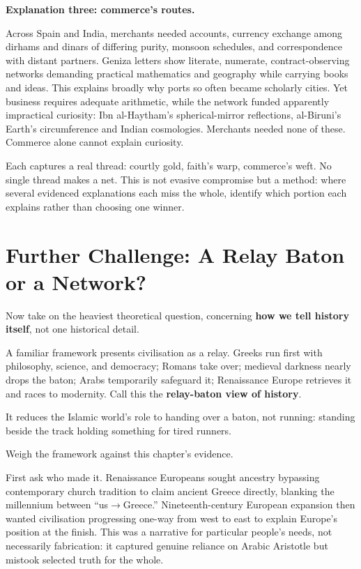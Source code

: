 \textbf{Explanation three: commerce's routes.}

Across Spain and India, merchants needed accounts, currency exchange among dirhams and dinars of differing purity, monsoon schedules, and correspondence with distant partners. Geniza letters show literate, numerate, contract-observing networks demanding practical mathematics and geography while carrying books and ideas. This explains broadly why ports so often became scholarly cities. Yet business requires adequate arithmetic, while the network funded apparently impractical curiosity: Ibn al-Haytham's spherical-mirror reflections, al-Biruni's Earth's circumference and Indian cosmologies. Merchants needed none of these. Commerce alone cannot explain curiosity.

Each captures a real thread: courtly gold, faith's warp, commerce's weft. No single thread makes a net. This is not evasive compromise but a method: where several evidenced explanations each miss the whole, identify which portion each explains rather than choosing one winner.

\section[Further Challenge: Relay or Network?]{Further Challenge: A Relay Baton or a Network?}
Now take on the heaviest theoretical question, concerning \textbf{how we tell history itself}, not one historical detail.

A familiar framework presents civilisation as a relay. Greeks run first with philosophy, science, and democracy; Romans take over; medieval darkness nearly drops the baton; Arabs temporarily safeguard it; Renaissance Europe retrieves it and races to modernity. Call this the \textbf{relay-baton view of history}.

It reduces the Islamic world's role to handing over a baton, not running: standing beside the track holding something for tired runners.

Weigh the framework against this chapter's evidence.

First ask who made it. Renaissance Europeans sought ancestry bypassing contemporary church tradition to claim ancient Greece directly, blanking the millennium between ``us$\rightarrow$\allowbreak Greece.'' Nineteenth-century European expansion then wanted civilisation progressing one-way from west to east to explain Europe's position at the finish. This was a narrative for particular people's needs, not necessarily fabrication: it captured genuine reliance on Arabic Aristotle but mistook selected truth for the whole.

